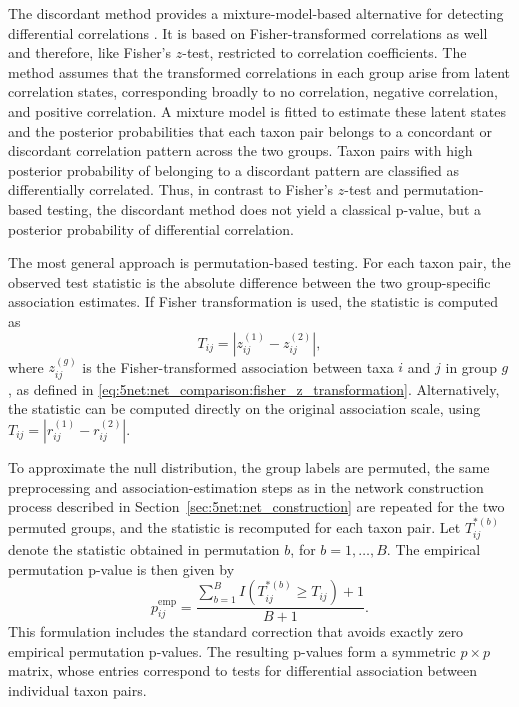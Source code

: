 The discordant method provides a mixture-model-based alternative for detecting differential correlations \citep{siska2016discordant}. It is based on Fisher-transformed correlations as well and therefore, like Fisher's $z$-test, restricted to correlation coefficients. The method assumes that the transformed correlations in each group arise from latent correlation states, corresponding broadly to no correlation, negative correlation, and positive correlation. A mixture model is fitted to estimate these latent states and the posterior probabilities that each taxon pair belongs to a concordant or discordant correlation pattern across the two groups. Taxon pairs with high posterior probability of belonging to a discordant pattern are classified as differentially correlated. Thus, in contrast to Fisher's $z$-test and permutation-based testing, the discordant method does not yield a classical p-value, but a posterior probability of differential correlation.

The most general approach is permutation-based testing. For each taxon pair, the observed test statistic is the absolute difference between the two group-specific association estimates. If Fisher transformation is used, the statistic is computed as
\begin{equation}
\label{eq:5net:net_comparison:differential_association_statistic}
T_{ij} =
\left|z_{ij}^{(1)} - z_{ij}^{(2)}\right|,
\end{equation}
where $z_{ij}^{(g)}$ is the Fisher-transformed association between taxa $i$ and $j$ in group $g$, as defined in \eqref{eq:5net:net_comparison:fisher_z_transformation}. Alternatively, the statistic can be computed directly on the original association scale, using $T_{ij}=|r_{ij}^{(1)}-r_{ij}^{(2)}|$.

To approximate the null distribution, the group labels are permuted, the same preprocessing and association-estimation steps as in the network construction process described in Section~\ref{sec:5net:net_construction} are repeated for the two permuted groups, and the statistic is recomputed for each taxon pair.
Let $T_{ij}^{*(b)}$ denote the statistic obtained in permutation $b$, for $b=1,\ldots,B$. The empirical permutation p-value is then given by
\begin{equation}
\label{eq:5net:net_comparison:differential_association_empirical_pvalue}
p_{ij}^{\mathrm{emp}} =
\frac{\sum_{b=1}^{B} I\left(T_{ij}^{*(b)} \geq T_{ij}\right) + 1}
{B+1}.
\end{equation}
This formulation includes the standard correction that avoids exactly zero empirical permutation p-values. The resulting p-values form a symmetric $p \times p$ matrix, whose entries correspond to tests for differential association between individual taxon pairs.

